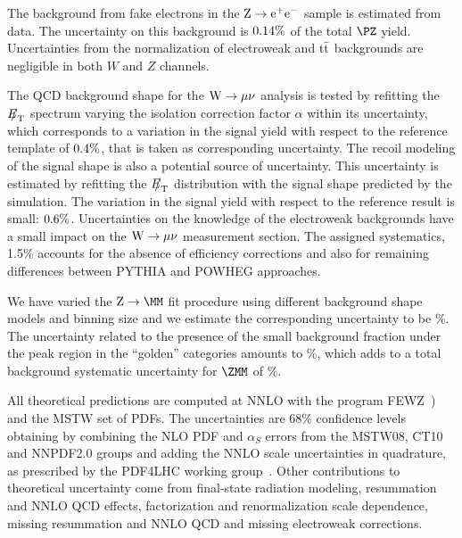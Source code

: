 \par
The background from
fake electrons in the $\mathrm{Z} \rightarrow \mathrm{e}^+\mathrm{e}^-$ sample
is estimated from data. The uncertainty on this
background is $ 0.14  \%$ of the total $\PZ$ yield.
Uncertainties from the normalization of electroweak and $\mathrm{t}\bar{\mathrm{t}}$
backgrounds are negligible in both $W$ and $Z$ channels.

The QCD background shape for the $\mathrm{W} \rightarrow \mu\nu$ analysis is tested by refitting the ${E\!\!\!/}_{\mathrm{T}}$ spectrum
varying the isolation correction factor $\alpha$ within its uncertainty, 
which corresponds to a variation in the signal yield with respect
to the reference template of $ 0.4 \%$, that is taken as corresponding uncertainty.
The recoil modeling of the signal shape is also a potential source of
uncertainty. This uncertainty is estimated by refitting the ${E\!\!\!/}_{\mathrm{T}}$
distribution with
the signal shape predicted by the simulation. The variation in the signal
yield with respect
to the reference result is small: $ 0.6 \%$.
Uncertainties on the knowledge of the electroweak backgrounds
have a small impact on the $\mathrm{W} \rightarrow \mu\nu$ measurement
section. The assigned systematics, 1.5\% accounts for the
absence of efficiency corrections and
also for remaining differences between PYTHIA and POWHEG approaches.

We have varied the $\Zmm$ fit procedure using different background shape models and binning size
and we estimate the corresponding uncertainty to be \ZMMFITSYST\%.
The uncertainty related to the presence of the small background fraction under the peak region in 
the ``golden'' categories amounts to \ZMMBKGSYST\%,
which adds to a total background systematic uncertainty for $\ZMM$ of \ZMMBKGTOTSYST\%.

All theoretical predictions are computed at NNLO with the program 
FEWZ~\cite{Melnikov:2006kv, Melnikov:2006di})
and the MSTW set of PDFs.  The uncertainties are 68\% confidence
levels obtaining by combining the NLO PDF and $\alpha_S$ errors
from the MSTW08, CT10 and NNPDF2.0 groups and adding the
NNLO scale uncertainties in quadrature, as prescribed by the
PDF4LHC working group~\cite{PDF4LHC}. Other contributions to
theoretical uncertainty come from final-state radiation modeling,
resummation and NNLO QCD effects, factorization and renormalization scale dependence,
missing resummation and NNLO QCD and missing electroweak corrections.

